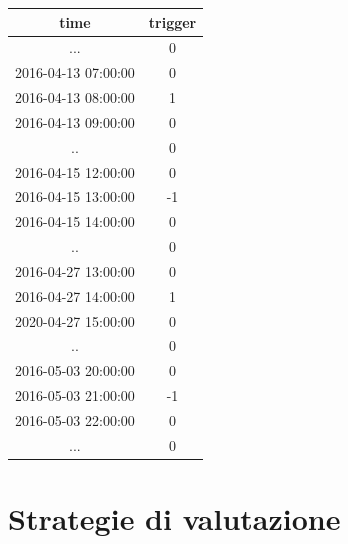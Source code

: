 \documentclass[a4paper,12pt]{report}
\begin{document}
\begin{fig}
	\begin{center}
		\begin{tabular}{||c c ||} 
			\hline
			time & trigger \\ [0.5ex] 
			\hline\hline
			... & 0 \\
			\hline
			2016-04-13 07:00:00 & 0 \\
			\hline
			2016-04-13 08:00:00 & 1 \\
			\hline
			2016-04-13 09:00:00 & 0 \\
			\hline
			.. & 0 \\
			\hline
			2016-04-15 12:00:00 & 0 \\
			\hline
			2016-04-15 13:00:00 & -1 \\
			\hline
			2016-04-15 14:00:00 & 0 \\
			\hline
			.. & 0 \\
			\hline
			2016-04-27 13:00:00 & 0 \\
			\hline
			2016-04-27 14:00:00 & 1 \\
			\hline
			2020-04-27 15:00:00 & 0 \\
			\hline
			.. & 0 \\
			\hline
			2016-05-03 20:00:00 & 0 \\
			\hline			
			2016-05-03 21:00:00 & -1 \\
			\hline
			2016-05-03 22:00:00 & 0 \\ 
			\hline
			... & 0 \\[1ex] 
			\hline
		\end{tabular}
	\end{center}
	\label{Tabella 9}
\end{fig}

\newpage
\chapter{Strategie di valutazione}	
\label{cap4}
\end{document}
